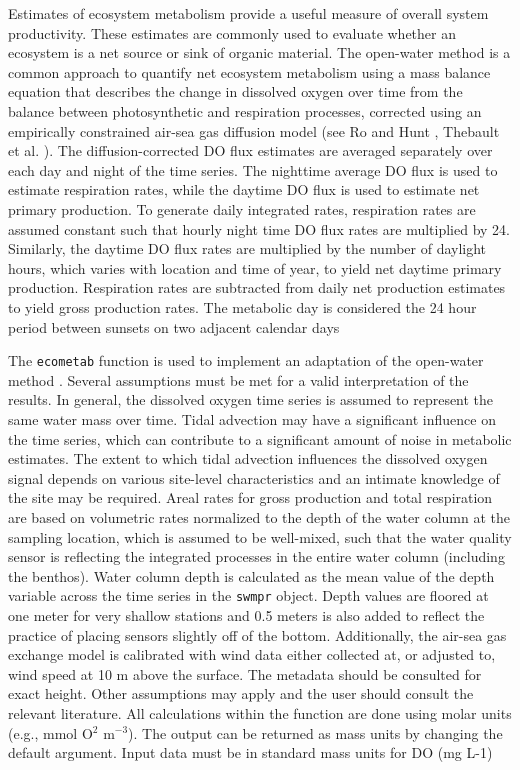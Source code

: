 \documentclass[10pt,letterpaper]{article}\usepackage[]{graphicx}\usepackage[]{color}
\begin{document}
Estimates of ecosystem metabolism provide a useful measure of overall system productivity.  These estimates are commonly used to evaluate whether an ecosystem is a net source or sink of organic material.  The open-water method \cite{Odum56} is a common approach to quantify net ecosystem metabolism using a mass balance equation that describes the change in dissolved oxygen over time from the balance between photosynthetic and respiration processes, corrected using an empirically constrained air-sea gas diffusion model (see Ro and Hunt \cite{Ro06}, Thebault et al. \cite{Thebault08}). The diffusion-corrected \ac{DO} flux estimates are averaged separately over each day and night of the time series. The nighttime average \ac{DO} flux is used to estimate respiration rates, while the daytime \ac{DO} flux is used to estimate net primary production. To generate daily integrated rates, respiration rates are assumed constant such that hourly night time \ac{DO} flux rates are multiplied by 24. Similarly, the daytime \ac{DO} flux rates are multiplied by the number of daylight hours, which varies with location and time of year, to yield net daytime primary production. Respiration rates are subtracted from daily net production estimates to yield gross production rates. The metabolic day is considered the 24 hour period between sunsets on two adjacent calendar days  

The \texttt{ecometab} function is used to implement an adaptation of the open-water method \cite{Odum56,Caffrey14}.  Several assumptions must be met for a valid interpretation of the results.  In general, the dissolved oxygen time series is assumed to represent the same water mass over time.  Tidal advection may have a significant influence on the time series, which can contribute to a significant amount of noise in metabolic estimates.  The extent to which tidal advection influences the dissolved oxygen signal depends on various site-level characteristics and an intimate knowledge of the site may be required.  Areal rates for gross production and total respiration are based on volumetric rates normalized to the depth of the water column at the sampling location, which is assumed to be well-mixed, such that the water quality sensor is reflecting the integrated processes in the entire water column (including the benthos).  Water column depth is calculated as the mean value of the depth variable across the time series in the \texttt{swmpr} object. Depth values are floored at one meter for very shallow stations and 0.5 meters is also added to reflect the practice of placing sensors slightly off of the bottom.  Additionally, the air-sea gas exchange model is calibrated with wind data either collected at, or adjusted to, wind speed at 10 m above the surface.  The metadata should be consulted for exact height. Other assumptions may apply and the user should consult the relevant literature.  All calculations within the function are done using molar units (e.g., mmol O$^2$ m$^{-3}$). The output can be returned as mass units by changing the default argument. Input data must be in standard mass units for \ac{DO} (mg L-1) 
\end{document}
